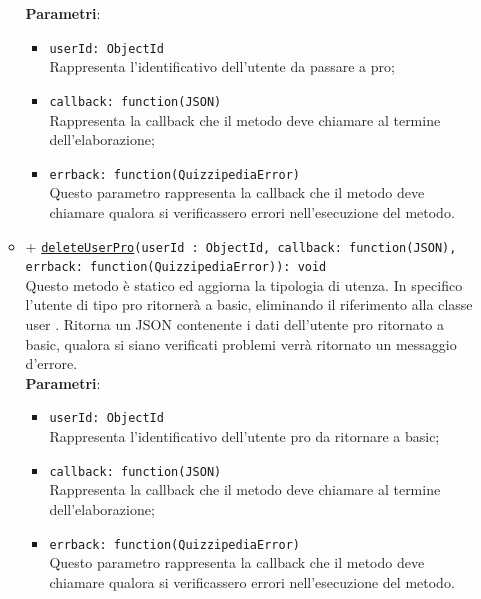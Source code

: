 \begin{itemize}
\begin{itemize}
		\textbf{Parametri}: 
			\begin{itemize}
			\item
				\texttt{userId: ObjectId} \\
				Rappresenta l'identificativo dell'utente da passare a pro;
			\item	
				\texttt{callback: function(JSON)} \\
				Rappresenta la callback che il metodo deve chiamare al termine dell'elaborazione;	
			\item	
				\texttt{errback: function(QuizzipediaError)} \\
				Questo parametro rappresenta la callback che il metodo deve chiamare qualora si verificassero errori nell'esecuzione del metodo.		
			\end{itemize}	
		\item	
		+ \texttt{\underline{deleteUserPro}(userId : ObjectId, callback: function(JSON), errback: function(QuizzipediaError)): void} \\	
		Questo metodo è statico ed aggiorna la tipologia di utenza. In specifico l'utente di tipo pro ritornerà a basic, eliminando il riferimento alla classe user . Ritorna un JSON contenente i dati dell'utente pro ritornato a basic, qualora si siano verificati problemi verrà ritornato un messaggio d'errore.	\\	
		\textbf{Parametri}: 
			\begin{itemize}
			\item
				\texttt{userId: ObjectId} \\
				Rappresenta l'identificativo dell'utente pro da ritornare a basic;
			\item	
				\texttt{callback: function(JSON)} \\
				Rappresenta la callback che il metodo deve chiamare al termine dell'elaborazione;	
			\item	
				\texttt{errback: function(QuizzipediaError)} \\
				Questo parametro rappresenta la callback che il metodo deve chiamare qualora si verificassero errori nell'esecuzione del metodo.		
			\end{itemize}		
		\end{itemize}
		
\end{itemize}